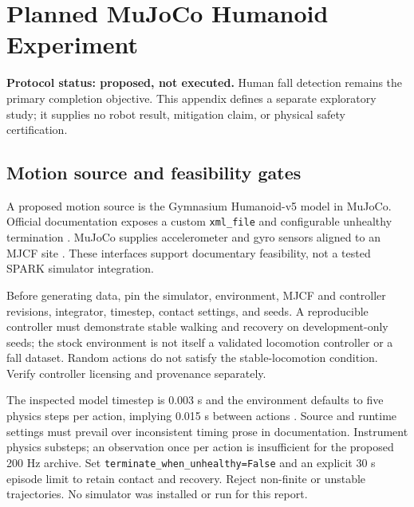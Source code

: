 \chapter{Planned MuJoCo Humanoid Experiment}
\label{app:robotics}
\textbf{Protocol status: proposed, not executed.} Human fall detection remains the primary completion objective. This appendix defines a separate exploratory study; it supplies no robot result, mitigation claim, or physical safety certification.

\section{Motion source and feasibility gates}
A proposed motion source is the Gymnasium Humanoid-v5 model in MuJoCo. Official documentation exposes a custom \texttt{xml\_file} and configurable unhealthy termination \cite{gymHumanoid}. MuJoCo supplies accelerometer and gyro sensors aligned to an MJCF site \cite{mujocoSensors}. These interfaces support documentary feasibility, not a tested SPARK simulator integration.

Before generating data, pin the simulator, environment, MJCF and controller revisions, integrator, timestep, contact settings, and seeds. A reproducible controller must demonstrate stable walking and recovery on development-only seeds; the stock environment is not itself a validated locomotion controller or a fall dataset. Random actions do not satisfy the stable-locomotion condition. Verify controller licensing and provenance separately.

The inspected model timestep is 0.003 s and the environment defaults to five physics steps per action, implying 0.015 s between actions \cite{gymHumanoidSource,gymHumanoidAsset}. Source and runtime settings must prevail over inconsistent timing prose in documentation. Instrument physics substeps; an observation once per action is insufficient for the proposed 200 Hz archive. Set \texttt{terminate\_when\_unhealthy=False} and an explicit 30 s episode limit to retain contact and recovery. Reject non-finite or unstable trajectories. No simulator was installed or run for this report.

